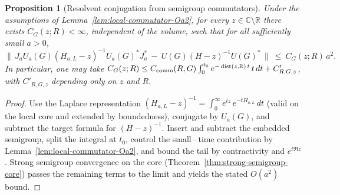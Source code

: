 \documentclass[11pt]{amsart}
\theoremstyle{plain}
\newtheorem{proposition}[theorem]{Proposition}
\theoremstyle{definition}
\theoremstyle{remark}
\begin{document}
\begin{proposition}[Resolvent conjugation from semigroup commutators]\label{prop:resolvent-from-commutator}
Under the assumptions of Lemma~\ref{lem:local-commutator-Oa2}, for every $z\in\mathbb C\setminus\mathbb R$ there exists $C_G(z;R)<\infty$, independent of the volume, such that for all sufficiently small $a>0$,
\[
  \big\|\, J_a U_a(G) (H_{a,L}-z)^{-1} U_a(G)^* J_a^*\ -\ U(G)(H-z)^{-1}U(G)^*\,\big\|\ \le\ C_G(z;R)\, a^2.
\]
In particular, one may take $C_G(z;R)\le C_{\rm comm}(R,G) \int_0^{t_0} e^{-\operatorname{dist}(z,\mathbb R)\,t}\, t\,dt + C'_{R,G,z}$, with $C'_{R,G,z}$ depending only on $z$ and $R$.
\end{proposition}
\begin{proof}
Use the Laplace representation $(H_{a,L}-z)^{-1}=\int_0^\infty e^{tz}\, e^{-t H_{a,L}}\,dt$ (valid on the local core and extended by boundedness), conjugate by $U_a(G)$, and subtract the target formula for $(H-z)^{-1}$. Insert and subtract the embedded semigroup, split the integral at $t_0$, control the small\,–\,time contribution by Lemma~\ref{lem:local-commutator-Oa2}, and bound the tail by contractivity and $e^{t\Re z}$. Strong semigroup convergence on the core (Theorem~\ref{thm:strong-semigroup-core}) passes the remaining terms to the limit and yields the stated $O(a^2)$ bound.
\end{proof}
\end{document}
